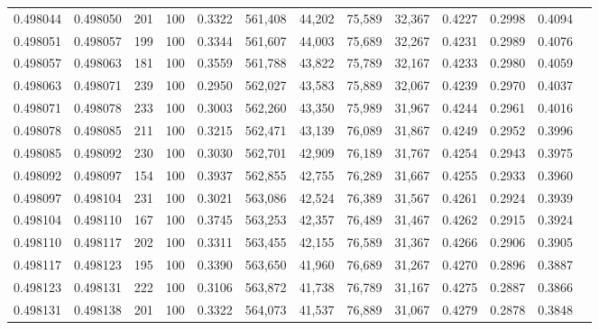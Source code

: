 \begin{tabular}{rrrrrrrrrrrrr}
0.498044 & 0.498050 &   201 & 100 &                                     0.3322 & 561,408 &  44,202 &  75,589 &  32,367 & 0.4227 & 0.2998 & 0.4094 \\
0.498051 & 0.498057 &   199 & 100 &                                     0.3344 & 561,607 &  44,003 &  75,689 &  32,267 & 0.4231 & 0.2989 & 0.4076 \\
0.498057 & 0.498063 &   181 & 100 &                                     0.3559 & 561,788 &  43,822 &  75,789 &  32,167 & 0.4233 & 0.2980 & 0.4059 \\
0.498063 & 0.498071 &   239 & 100 &                                     0.2950 & 562,027 &  43,583 &  75,889 &  32,067 & 0.4239 & 0.2970 & 0.4037 \\
0.498071 & 0.498078 &   233 & 100 &                                     0.3003 & 562,260 &  43,350 &  75,989 &  31,967 & 0.4244 & 0.2961 & 0.4016 \\
0.498078 & 0.498085 &   211 & 100 &                                     0.3215 & 562,471 &  43,139 &  76,089 &  31,867 & 0.4249 & 0.2952 & 0.3996 \\
0.498085 & 0.498092 &   230 & 100 &                                     0.3030 & 562,701 &  42,909 &  76,189 &  31,767 & 0.4254 & 0.2943 & 0.3975 \\
0.498092 & 0.498097 &   154 & 100 &                                     0.3937 & 562,855 &  42,755 &  76,289 &  31,667 & 0.4255 & 0.2933 & 0.3960 \\
0.498097 & 0.498104 &   231 & 100 &                                     0.3021 & 563,086 &  42,524 &  76,389 &  31,567 & 0.4261 & 0.2924 & 0.3939 \\
0.498104 & 0.498110 &   167 & 100 &                                     0.3745 & 563,253 &  42,357 &  76,489 &  31,467 & 0.4262 & 0.2915 & 0.3924 \\
0.498110 & 0.498117 &   202 & 100 &                                     0.3311 & 563,455 &  42,155 &  76,589 &  31,367 & 0.4266 & 0.2906 & 0.3905 \\
0.498117 & 0.498123 &   195 & 100 &                                     0.3390 & 563,650 &  41,960 &  76,689 &  31,267 & 0.4270 & 0.2896 & 0.3887 \\
0.498123 & 0.498131 &   222 & 100 &                                     0.3106 & 563,872 &  41,738 &  76,789 &  31,167 & 0.4275 & 0.2887 & 0.3866 \\
0.498131 & 0.498138 &   201 & 100 &                                     0.3322 & 564,073 &  41,537 &  76,889 &  31,067 & 0.4279 & 0.2878 & 0.3848 \\

\end{tabular}
